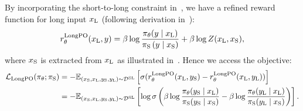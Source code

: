 By incorporating the short-to-long constraint in~, we have a refined reward function for long input $x_\text{L}$ (following derivation in~):
\begin{equation}
\label{eq:longpo_reward}
r_\theta^{\text{LongPO}}(x_\text{L}, y) = \beta \log \frac{\pi_\theta(y \mid x_\text{L})}{\pi_\text{S}\left(y \mid x_\text{S}\right)} + \beta \log Z(x_\text{L}, x_\text{S}),
\end{equation}
where $x_\text{S}$ is extracted from $x_\text{L}$ as illustrated in~.
Hence we access the \ourMethod{} objective:
\begin{equation}
    \label{eq:longpo}
    \begin{aligned}
        \mathcal{L}_{\text{LongPO}}(\pi_\theta; \pi_\text{S}) &= - \mathbb{E}_{(x_\text{S}, x_\text{L}, y_\text{S}, y_\text{L}) \sim \mathcal{D}^{\text{SL}}}\left[\sigma(r^{\text{LongPO}}_\theta(x_\text{L}, y_\text{S})- r^{\text{LongPO}}_\theta(x_\text{L}, y_\text{L}))\right] \\
        &= - \mathbb{E}_{(x_\text{S}, x_\text{L}, y_\text{S}, y_\text{L}) \sim \mathcal{D}^{\text{SL}}}\left[ \log \sigma \left( \beta \log \frac{\pi_\theta(y_\text{S} \mid x_\text{L})}{\pi_\text{S}(y_\text{S} \mid x_\text{S})} - \beta \log \frac{\pi_\theta(y_\text{L} \mid x_\text{L})}{\pi_\text{S}(y_\text{L} \mid x_\text{S})}\right) \right].
    \end{aligned}
\end{equation}







